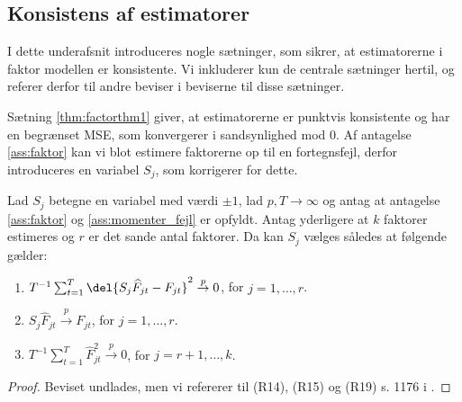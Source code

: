 \subsection{Konsistens af estimatorer}
I dette underafsnit introduceres nogle sætninger, som sikrer, at estimatorerne i faktor modellen er konsistente.
Vi inkluderer kun de centrale sætninger hertil, og referer derfor til andre beviser i beviserne til disse sætninger.

Sætning \ref{thm:factorthm1} giver, at estimatorerne er punktvis konsistente og har en begrænset MSE, som konvergerer i sandsynlighed mod 0.
Af antagelse \ref{ass:faktor} kan vi blot estimere faktorerne op til en fortegnsfejl, derfor introduceres en variabel \(S_j\), som korrigerer for dette.
%
\begin{thm} \label{thm:factorthm1}
Lad \(S_j\) betegne en variabel med værdi \(\pm 1\), lad \(p, T \rightarrow \infty\) og antag at antagelse \ref{ass:faktor} og \ref{ass:momenter_fejl} er opfyldt.
Antag yderligere at \(k\) faktorer estimeres og \(r\) er det sande antal faktorer.
Da kan \(S_j\) vælges således at følgende gælder:
\begin{enumerate}[label=\alph*)]
\item \(T^{-1} \sum_{t=1}^T \del{S_j \widehat{F}_{jt} - F_{jt}}^2 \overset{p}{\rightarrow} 0\), for \(j=1, \ldots, r\).
\item \(S_j \widehat{F}_{jt} \overset{p}{\rightarrow} F_{jt}\), for \(j=1, \ldots, r\).
\item \(T^{-1} \sum_{t=1}^T \widehat{F}_{jt}^2 \overset{p}{\rightarrow} 0\), for \(j=r+1, \ldots, k\).
\end{enumerate}
\end{thm}
%
\begin{proof}
Beviset undlades, men vi refererer til (R14), (R15) og (R19) s. 1176 i \citep{stock_watson_2002a}.
\end{proof}
%

